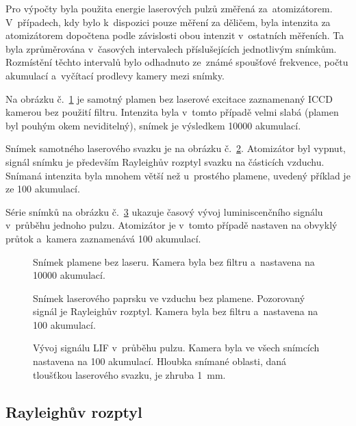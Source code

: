 Pro výpočty byla použita energie laserových pulzů změřená za~atomizátorem.
V~případech, kdy bylo k~dispozici pouze měření za děličem,
byla intenzita za atomizátorem dopočtena podle závislosti obou intenzit
v~ostatních měřeních.
Ta byla zprůměrována v~časových intervalech příslušejících jednotlivým snímkům.
Rozmístění těchto intervalů bylo odhadnuto ze~známé spoušťové
frekvence, počtu akumulací a~vyčítací prodlevy kamery mezi sním\-ky.

Na obrázku č.~\ref{fig:lif-flame} je samotný plamen bez laserové excitace
zaznamenaný ICCD kamerou bez použití filtru.
Intenzita byla v~tomto případě velmi slabá
(plamen byl pouhým okem neviditelný),
snímek je výsledkem \num{10000} akumulací.

Snímek samotného laserového svazku je na obrázku č.~\ref{fig:lif-beam}.
Atomizátor byl vypnut, signál snímku je především Rayleighův rozptyl
svazku na částicích vzduchu.
Snímaná intenzita byla mnohem větší než u~prostého plamene,
uvedený příklad je ze \num{100} akumulací.

Série snímků na obrázku č.~\ref{fig:lif-timeev} ukazuje časový vývoj
luminiscenčního signálu v~průběhu jednoho pulzu.
Atomizátor je v~tomto případě nastaven na obvyklý průtok
a~kamera zaznamenává 100 akumulací.

\begin{figure}[p]
	
	\caption{Snímek plamene bez laseru.
		Kamera byla bez filtru a~nastavena na \num{10000} akumulací.}
	\label{fig:lif-flame}
\end{figure}
\begin{figure}[p]
	
	\caption{Snímek laserového paprsku ve vzduchu bez plamene.
		Pozorovaný signál je Rayleighův rozptyl.
		Kamera byla bez filtru a~nastavena na \num{100} akumulací.}
	\label{fig:lif-beam}
\end{figure}

\begin{figure}[p]
	
	\caption{Vývoj signálu LIF v~průběhu pulzu.
		Kamera byla ve všech snímcích nastavena na \num{100} akumulací.
		Hloubka snímané oblasti, daná tloušťkou laserového svazku,
		je zhruba \SI{1}{\milli\metre}.}
	\label{fig:lif-timeev}
\end{figure}

\subsection{Rayleighův rozptyl}
\label{sec:lif-rayleigh}

